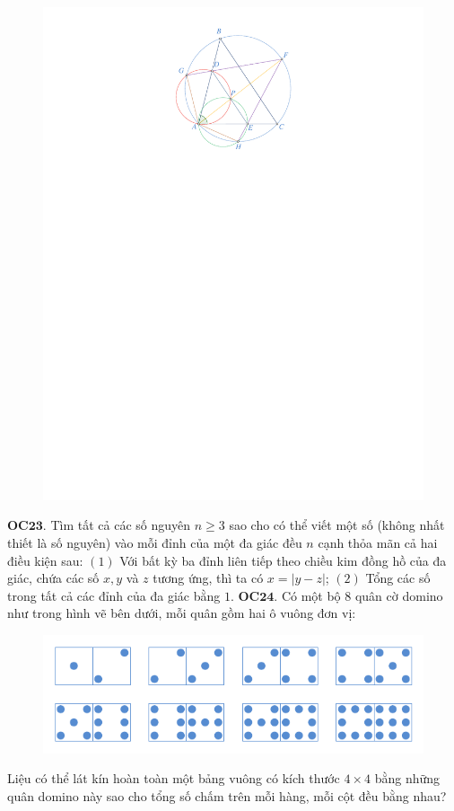 \begin{multicols}{2}
\begin{figure}[H]
		\includegraphics[width= 0.8\linewidth]{OC22}
		\vspace*{-10pt}
	\end{figure}
	{\bf\color{cackithi} OC$\pmb{23.}$} Tìm tất cả các số nguyên $n\ge 3$ sao cho có thể viết một số
	(không nhất thiết là số nguyên) vào mỗi đỉnh của một đa giác đều $n$ cạnh thỏa mãn cả hai điều kiện sau:
	\vskip 0.1cm
	$(1)$  Với bất kỳ ba đỉnh liên tiếp theo chiều kim đồng hồ của đa giác, 
	chứa các số $x, y$ và $z$ tương ứng, thì ta có $x=|y-z|$;
	\vskip 0.1cm
	$(2)$ Tổng các số trong tất cả các đỉnh của đa giác bằng $1$.
	\vskip 0.1cm
	{\bf\color{cackithi} OC$\pmb{24.}$} Có một bộ $8$ quân cờ domino như trong hình vẽ bên dưới, mỗi quân gồm hai ô vuông đơn vị:
	\begin{figure}[H]
		\vspace*{-5pt}
		\centering
		\includegraphics[width=0.9\linewidth]{OC24}
		\vspace*{-10pt}
	\end{figure}
	Liệu có thể lát kín hoàn toàn một bảng vuông có kích thước $4 \times 4$ bằng những quân domino này sao cho tổng số chấm trên mỗi hàng, mỗi cột đều bằng nhau?
\end{multicols}

